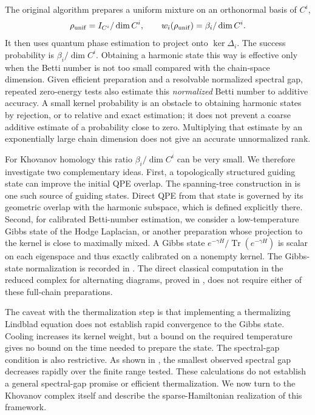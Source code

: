 \documentclass[a4paper,onecolumn,unpublished]{quantumarticle}
\theoremstyle{plain}
\theoremstyle{definition}
\theoremstyle{definition}
\numberwithin{equation}{section}
\begin{document}
The original algorithm prepares a uniform mixture on an orthonormal basis of \(C^i\),
\[
 \rho_{\rm unif}=I_{C^i}/\dim C^i,
 \qquad w_i(\rho_{\rm unif})=\beta_i/\dim C^i.
\]
It then uses quantum phase estimation to project onto \(\ker\Delta_i\). The success probability is \(\beta_i/\dim C^i\). Obtaining a harmonic state this way is effective only when the Betti number is not too small compared with the chain-space dimension. Given efficient preparation and a resolvable normalized spectral gap, repeated zero-energy tests also estimate this \emph{normalized} Betti number to additive accuracy. A small kernel probability is an obstacle to obtaining harmonic states by rejection, or to relative and exact estimation; it does not prevent a coarse additive estimate of a probability close to zero. Multiplying that estimate by an exponentially large chain dimension does not give an accurate unnormalized rank.

For Khovanov homology this ratio \(\beta_i/\dim C^i\) can be very small. We therefore investigate two complementary ideas. First, a topologically structured guiding state can improve the initial QPE overlap. The spanning-tree construction in  is one such source of guiding states. Direct QPE from that state is governed by its geometric overlap with the harmonic subspace, which is defined explicitly there. Second, for calibrated Betti-number estimation, we consider a low-temperature Gibbs state of the Hodge Laplacian, or another preparation whose projection to the kernel is close to maximally mixed. A Gibbs state \(e^{-\gamma H}/\operatorname{Tr}(e^{-\gamma H})\) is scalar on each eigenspace and thus exactly calibrated on a nonempty kernel. The Gibbs-state normalization is recorded in . The direct classical computation in the reduced complex for alternating diagrams, proved in , does not require either of these full-chain preparations.

The caveat with the thermalization step is that implementing a thermalizing Lindblad equation does not establish rapid convergence to the Gibbs state. Cooling increases its kernel weight, but a bound on the required temperature gives no bound on the time needed to prepare the state. The spectral-gap condition is also restrictive. As shown in , the smallest observed spectral gap decreases rapidly over the finite range tested. These calculations do not establish a general spectral-gap promise or efficient thermalization. We now turn to the Khovanov complex itself and describe the sparse-Hamiltonian realization of this framework.
\end{document}
